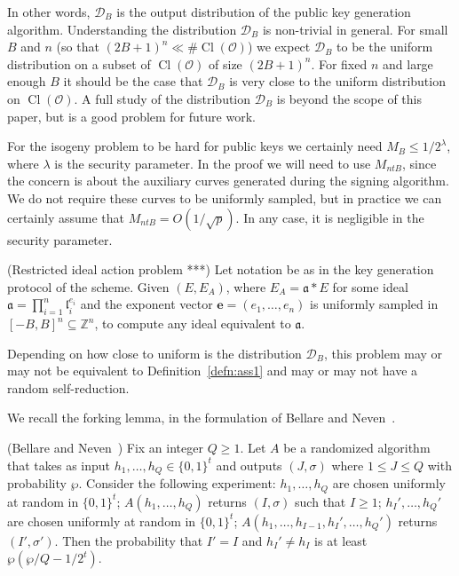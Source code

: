\documentclass{llncs}
\newcommand{\D}{\mathcal{D}}
\newcommand{\OO}{\mathcal{O}}
\newcommand{\Z}{\mathbb{Z}}
\DeclareMathOperator{\Cl}{Cl}
\renewcommand{\a}{\mathfrak{a}}
\renewcommand{\l}{\mathfrak{l}}
\newcommand{\e}{\mathbf{e}}
\begin{document}
In other words, $\D_B$ is the output distribution of the public key generation algorithm.
Understanding the distribution $\D_B$ is non-trivial in general.
For small $B$ and $n$ (so that $(2B+1)^n \ll \#\Cl(\OO)$) we expect $\D_B$ to be the uniform distribution on a subset of $\Cl(\OO)$ of size $(2B+1)^n$. For fixed $n$ and large enough $B$ it should be the case that $\D_B$ is very close to the uniform distribution on $\Cl(\OO)$.
A full study of the distribution $\D_B$ is beyond the scope of this paper, but is a good problem for future work.

For the isogeny problem to be hard for public keys we certainly need $M_B \le 1/2^\lambda$, where $\lambda$ is the security parameter.
In the proof we will need to use $M_{ntB}$, since the concern is about the auxiliary curves generated during the signing algorithm. We do not require these curves to be uniformly sampled, but in practice we can certainly assume that $M_{ntB} = O( 1/\sqrt{p} )$. In any case, it is negligible in the security parameter.



\begin{definition} \label{defn:ass1p}
(Restricted ideal action problem ***)
Let notation be as in the key generation protocol of the scheme.
Given $(E, E_A)$, where $E_A = \a * E$ for some ideal $\a = \prod_{i=1}^n \l_i^{e_i}$ and the exponent vector $\e = (e_1, \dots, e_n)$ is uniformly sampled in $[-B,B]^n \subseteq \Z^n$, to compute any ideal equivalent to $\a$.
\end{definition}

Depending on how close to uniform is the distribution $\D_B$, this problem may or may not be equivalent to Definition~\ref{defn:ass1} and may or may not have a random self-reduction.


We recall the forking lemma, in the formulation of Bellare and Neven~\cite{BN06}.

\begin{lemma} \label{forking-lemma} (Bellare and Neven~\cite{BN06})
Fix an integer $Q \ge 1$. Let $A$ be a randomized algorithm that takes as input $h_1, \dots, h_Q \in \{0,1\}^t$ and outputs $(J, \sigma)$ where $ 1\le J \le Q$ with probability $\wp$.
Consider the following experiment: $h_1, \dots, h_Q$ are chosen uniformly at random in $\{0,1\}^t$; $A(h_1, \dots, h_Q )$ returns $(I,\sigma)$ such that $I \ge 1$; $h_I', \dots, h_Q'$ are chosen uniformly at random in $\{0,1\}^t$; $A( h_1, \dots, h_{I-1}, h_I', \dots, h_Q' )$ returns $(I', \sigma')$.
Then the probability that $I' = I$ and $h_{I}' \ne h_I$ is at least $\wp( \wp/Q - 1/2^t )$.
\end{lemma}
\end{document}
